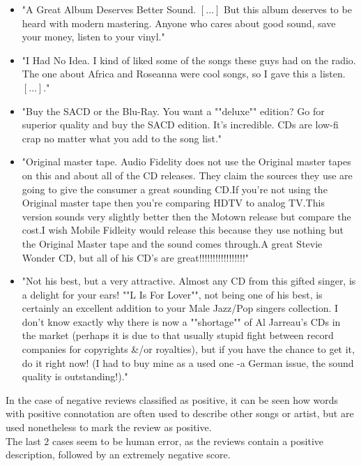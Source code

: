 \documentclass[
12pt,
a4paper,
oneside,
headinclude,
footinclude]{article}
\theoremstyle{definition} %
\begin{document}
\begin{itemize}
    \item "A Great Album Deserves Better Sound. $[\ldots]$ But this album deserves to be heard with modern mastering. Anyone who cares about good sound, save your money, listen to your vinyl."
    \item "I Had No Idea. I kind of liked some of the songs these guys had on the radio. The one about Africa and Roseanna were cool songs, so I gave this a listen. $[\ldots]$."
    \item "Buy the SACD or the Blu-Ray. You want a ""deluxe"" edition? Go for superior quality and buy the SACD edition. It's incredible. CDs are low-fi crap no matter what you add to the song list."
    \item "Original master tape. Audio Fidelity does not use the Original master tapes on this and about all of the CD releases.  They claim the sources they use are going to give the consumer a great sounding CD.If you're not using the Original master tape then you're comparing HDTV to analog TV.This version sounds very slightly better then the Motown release but compare the cost.I wish Mobile Fidleity would release this because they use nothing but the Original Master tape and the sound comes through.A great Stevie Wonder CD, but all of his CD's are great!!!!!!!!!!!!!!!!!"
    \item "Not his best, but a very attractive. Almost any CD from this gifted singer, is a delight for your ears! ""L Is For Lover"", not being one of his best, is certainly an excellent addition to your Male Jazz/Pop singers collection. I don't know exactly why there is now a ""shortage"" of Al Jarreau's CDs in the market (perhaps it is due to that usually stupid fight between record companies for copyrights \&/or royalties), but if you have the chance to get it, do it right now! (I had to buy mine as a used one -a German issue, the sound quality is outstanding!)."    
\end{itemize}

In the case of negative reviews classified as positive, it can be seen how words with positive connotation are often used to describe other songs or artist, but are used nonetheless to mark the review as positive.\\
The last $2$ cases seem to be human error, as the reviews contain a positive description, followed by an extremely negative score.






\end{document}
